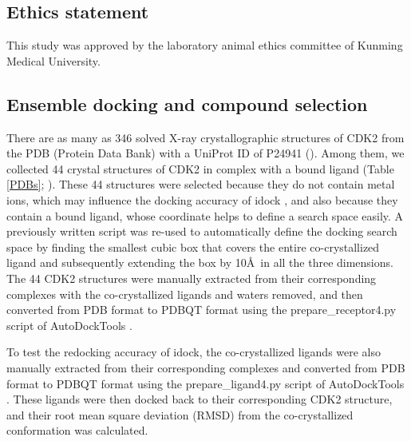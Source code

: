 \documentclass[10pt,letterpaper]{article}
\begin{document}
\subsection*{Ethics statement}

This study was approved by the laboratory animal ethics committee of Kunming Medical University.

\subsection*{Ensemble docking and compound selection}

There are as many as 346 solved X-ray crystallographic structures of CDK2 from the PDB (Protein Data Bank) \cite{540,537} with a UniProt ID of P24941 (). Among them, we collected 44 crystal structures of CDK2 in complex with a bound ligand (Table \ref{PDBs}; ). These 44 structures were selected because they do not contain metal ions, which may influence the docking accuracy of idock \cite{1362}, and also because they contain a bound ligand, whose coordinate helps to define a search space easily. A previously written script \cite{1362} was re-used to automatically define the docking search space by finding the smallest cubic box that covers the entire co-crystallized ligand and subsequently extending the box by 10\AA\ in all the three dimensions. The 44 CDK2 structures were manually extracted from their corresponding complexes with the co-crystallized ligands and waters removed, and then converted from PDB format to PDBQT format using the prepare\_receptor4.py script of AutoDockTools \cite{596}.

To test the redocking accuracy of idock, the co-crystallized ligands were also manually extracted from their corresponding complexes and converted from PDB format to PDBQT format using the prepare\_ligand4.py script of AutoDockTools \cite{596}. These ligands were then docked back to their corresponding CDK2 structure, and their root mean square deviation (RMSD) from the co-crystallized conformation was calculated.
\end{document}
